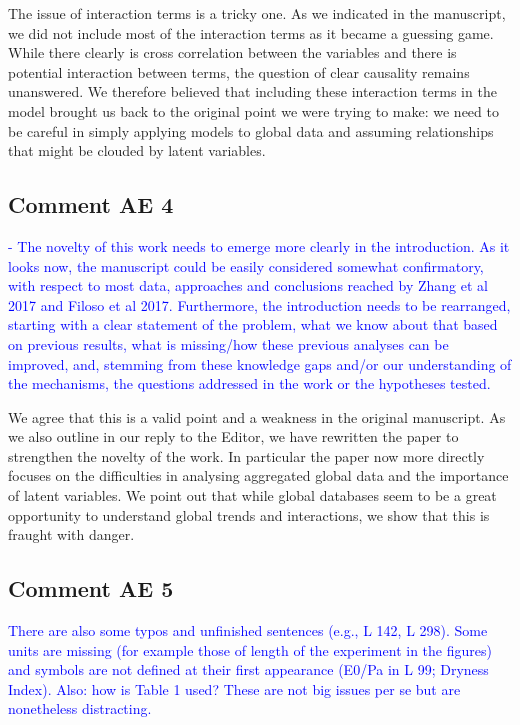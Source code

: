 \documentclass[]{elsarticle} %
\begin{document}
The issue of interaction terms is a tricky one. As we indicated in the manuscript, we did not include most of the interaction terms as it became a guessing game. While there clearly is cross correlation between the variables and there is potential interaction between terms, the question of clear causality remains unanswered. We therefore believed that including these interaction terms in the model brought us back to the original point we were trying to make: we need to be careful in simply applying models to global data and assuming relationships that might be clouded by latent variables.

\hypertarget{comment-ae-4}{%
\subsection{Comment AE 4}\label{comment-ae-4}}

\textcolor{blue}{- The novelty of this work needs to emerge more clearly in the introduction. As it looks now, the manuscript could be easily considered somewhat confirmatory, with respect to most data, approaches and conclusions reached by Zhang et al 2017 and Filoso et al 2017. Furthermore, the introduction needs to be rearranged, starting with a clear statement of the problem, what we know about that based on previous results, what is missing/how these previous analyses can be improved, and, stemming from these knowledge gaps and/or our understanding of the mechanisms, the questions addressed in the work or the hypotheses tested.}

We agree that this is a valid point and a weakness in the original manuscript. As we also outline in our reply to the Editor, we have rewritten the paper to strengthen the novelty of the work. In particular the paper now more directly focuses on the difficulties in analysing aggregated global data and the importance of latent variables. We point out that while global databases seem to be a great opportunity to understand global trends and interactions, we show that this is fraught with danger.

\hypertarget{comment-ae-5}{%
\subsection{Comment AE 5}\label{comment-ae-5}}

\textcolor{blue}{There are also some typos and unfinished sentences (e.g., L 142, L 298). Some units are missing (for example those of length of the experiment in the figures) and symbols are not defined at their first appearance (E0/Pa in L 99; Dryness Index). Also: how is Table 1 used? These are not big issues per se but are nonetheless distracting.}
\end{document}
